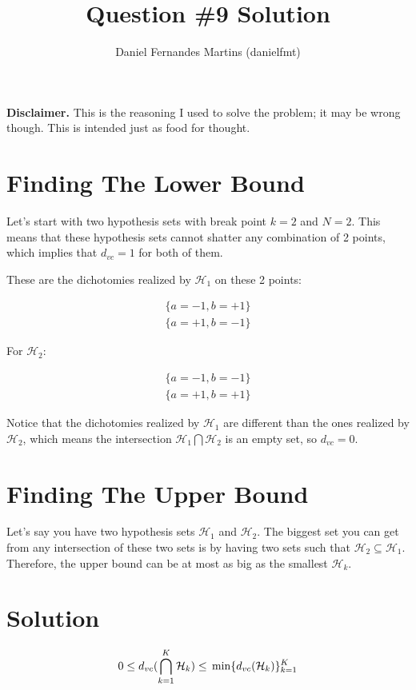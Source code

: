 \documentclass{article}
\author{Daniel Fernandes Martins (danielfmt)}
\title{Question \#9 Solution}
\begin{document}
\maketitle

\textbf{Disclaimer.} This is the reasoning I used to solve the problem; it
may be wrong though. This is intended just as food for thought.

\section{Finding The Lower Bound}

Let's start with two hypothesis sets with break point $k=2$ and $N=2$. This
means that these hypothesis sets cannot shatter any combination of 2 points,
which implies that $d_{vc}=1$ for both of them.

These are the dichotomies realized by $\mathcal{H}_1$ on these 2 points:

\begin{equation*}
\begin{split}
\{a=-1, b=+1\} \\
\{a=+1, b=-1\}
\end{split}
\end{equation*}

For $\mathcal{H}_2$:

\begin{equation*}
\begin{split}
\{a=-1, b=-1\} \\
\{a=+1, b=+1\}
\end{split}
\end{equation*}

Notice that the dichotomies realized by $\mathcal{H}_1$ are different than the
ones realized by $\mathcal{H}_2$, which means the intersection
$\mathcal{H}_1\bigcap\mathcal{H}_2$ is an empty set, so $d_{vc}=0$.

\section{Finding The Upper Bound}

Let's say you have two hypothesis sets $\mathcal{H}_1$ and $\mathcal{H}_2$. The
biggest set you can get from any intersection of these two sets is by having
two sets such that $\mathcal{H}_2\subseteq\mathcal{H}_1$. Therefore, the upper
bound can be at most as big as the smallest $\mathcal{H}_k$.

\section{Solution}

\begin{equation*}
0 \leq \\
  d_{vc}(\bigcap_{k=1}^K\mathcal{H}_k) \leq \\
  \min\{d_{vc}(\mathcal{H}_k)\}_{k=1}^K
\end{equation*}
\end{document}
